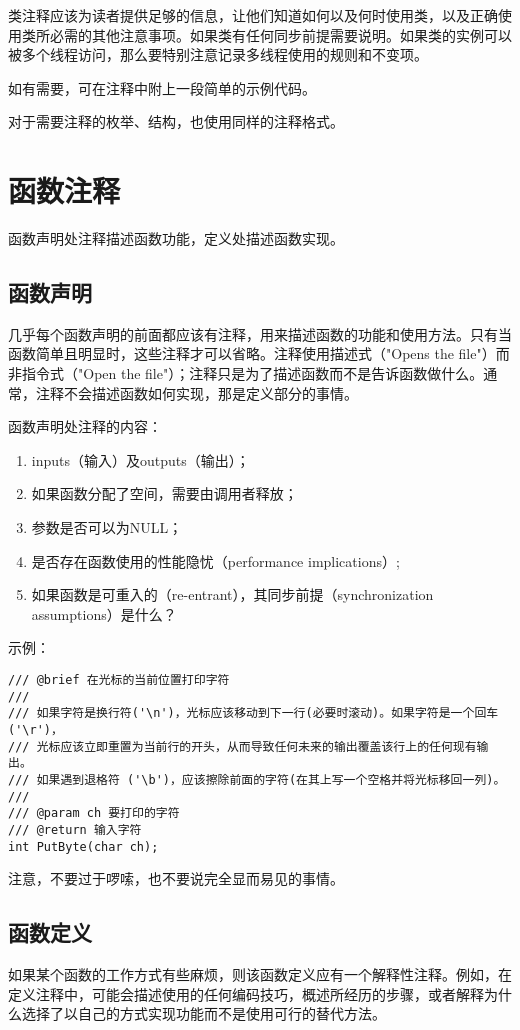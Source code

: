 类注释应该为读者提供足够的信息，让他们知道如何以及何时使用类，以及正确使用类所必需的其他注意事项。如果类有任何同步前提需要说明。如果类的实例可以被多个线程访问，那么要特别注意记录多线程使用的规则和不变项。

如有需要，可在注释中附上一段简单的示例代码。

对于需要注释的枚举、结构，也使用同样的注释格式。


\section{函数注释}
函数声明处注释描述函数功能，定义处描述函数实现。

\subsection{函数声明}
几乎每个函数声明的前面都应该有注释，用来描述函数的功能和使用方法。只有当函数简单且明显时，这些注释才可以省略。注释使用描述式（"Opens the file"）而非指令式（"Open the file"）；注释只是为了描述函数而不是告诉函数做什么。通常，注释不会描述函数如何实现，那是定义部分的事情。

函数声明处注释的内容：
\begin{enumerate}[1）]
\item inputs（输入）及outputs（输出）；
\item 如果函数分配了空间，需要由调用者释放；
\item 参数是否可以为NULL；
\item 是否存在函数使用的性能隐忧（performance implications）;
\item 如果函数是可重入的（re-entrant），其同步前提（synchronization assumptions）是什么？
\end{enumerate}

示例：
\begin{verbatim}
/// @brief 在光标的当前位置打印字符
///
/// 如果字符是换行符('\n')，光标应该移动到下一行(必要时滚动)。如果字符是一个回车('\r')，
/// 光标应该立即重置为当前行的开头，从而导致任何未来的输出覆盖该行上的任何现有输出。
/// 如果遇到退格符 ('\b')，应该擦除前面的字符(在其上写一个空格并将光标移回一列)。
///
/// @param ch 要打印的字符
/// @return 输入字符
int PutByte(char ch);
\end{verbatim}

注意，不要过于啰嗦，也不要说完全显而易见的事情。


\subsection{函数定义}
如果某个函数的工作方式有些麻烦，则该函数定义应有一个解释性注释。例如，在定义注释中，可能会描述使用的任何编码技巧，概述所经历的步骤，或者解释为什么选择了以自己的方式实现功能而不是使用可行的替代方法。

